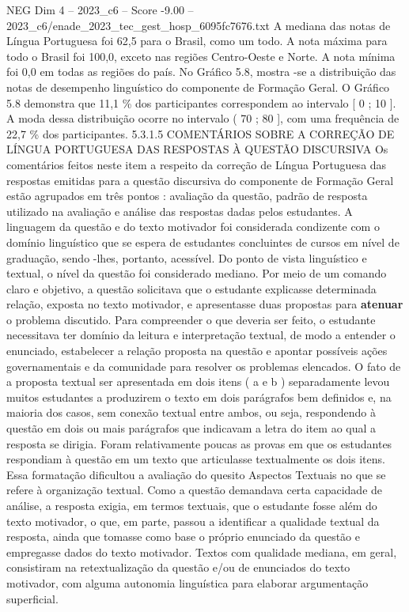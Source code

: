 \begin{textsample}{NEG Dim 4 – 2023\_c6 – Score -9.00 – 2023\_c6/enade\_2023\_tec\_gest\_hosp\_6095fc7676.txt}
A mediana das notas de Língua Portuguesa foi 62,5 para o Brasil, como um todo.
A nota máxima para todo o Brasil foi 100,0, exceto nas regiões Centro-Oeste e Norte.
A nota mínima foi 0,0 em todas as regiões do país.
No Gráfico 5.8, mostra -se a distribuição das notas de desempenho linguístico do componente de Formação Geral.
O Gráfico 5.8 demonstra que 11,1 \% dos participantes correspondem ao intervalo [ 0 ; 10 ].
A moda dessa distribuição ocorre no intervalo ( 70 ; 80 ], com uma frequência de 22,7 \% dos participantes. 5.3.1.5 COMENTÁRIOS SOBRE A CORREÇÃO DE LÍNGUA PORTUGUESA DAS RESPOSTAS À QUESTÃO DISCURSIVA Os comentários feitos neste item a respeito da correção de Língua Portuguesa das respostas emitidas para a questão discursiva do componente de Formação Geral estão agrupados em três pontos : avaliação da questão, padrão de resposta utilizado na avaliação e análise das respostas dadas pelos estudantes.
A linguagem da questão e do texto motivador foi considerada condizente com o domínio linguístico que se espera de estudantes concluintes de cursos em nível de graduação, sendo -lhes, portanto, acessível.
Do ponto de vista linguístico e textual, o nível da questão foi considerado mediano.
Por meio de um comando claro e objetivo, a questão solicitava que o estudante explicasse determinada relação, exposta no texto motivador, e apresentasse duas propostas para \textbf{atenuar} o problema discutido.
Para compreender o que deveria ser feito, o estudante necessitava ter domínio da leitura e interpretação textual, de modo a entender o enunciado, estabelecer a relação proposta na questão e apontar possíveis ações governamentais e da comunidade para resolver os problemas elencados.
O fato de a proposta textual ser apresentada em dois itens ( a e b ) separadamente levou muitos estudantes a produzirem o texto em dois parágrafos bem definidos e, na maioria dos casos, sem conexão textual entre ambos, ou seja, respondendo à questão em dois ou mais parágrafos que indicavam a letra do item ao qual a resposta se dirigia.
Foram relativamente poucas as provas em que os estudantes respondiam à questão em um texto que articulasse textualmente os dois itens.
Essa formatação dificultou a avaliação do quesito Aspectos Textuais no que se refere à organização textual.
Como a questão demandava certa capacidade de análise, a resposta exigia, em termos textuais, que o estudante fosse além do texto motivador, o que, em parte, passou a identificar a qualidade textual da resposta, ainda que tomasse como base o próprio enunciado da questão e empregasse dados do texto motivador.
Textos com qualidade mediana, em geral, consistiram na retextualização da questão e/ou de enunciados do texto motivador, com alguma autonomia linguística para elaborar argumentação superficial.

\end{textsample}
